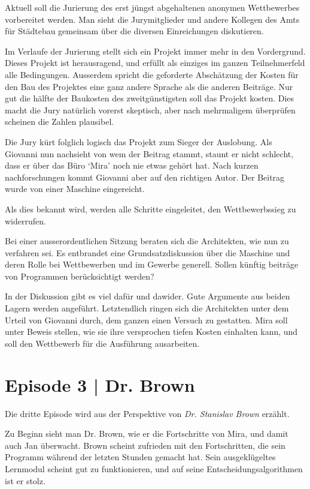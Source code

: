 \documentclass[11pt,a4paper,ngerman]{scrreprt}
\begin{document}
Aktuell soll die Jurierung des erst jüngst abgehaltenen anonymen Wettbewerbes
vorbereitet werden. Man sieht die Jurymitglieder und andere Kollegen des Amts
für Städtebau gemeinsam über die diversen Einreichungen diskutieren.

Im Verlaufe der Jurierung stellt sich ein Projekt immer mehr in den
Vordergrund. Dieses Projekt ist herausragend, und erfüllt als einziges im
ganzen Teilnehmerfeld alle Bedingungen. Ausserdem spricht die geforderte
Abschätzung der Kosten für den Bau des Projektes eine ganz andere Sprache als
die anderen Beiträge. Nur gut die hälfte der Baukosten des zweitgünstigsten
soll das Projekt kosten. Dies macht die Jury natürlich vorerst skeptisch,
aber nach mehrmaligem überprüfen scheinen die Zahlen plausibel.

Die Jury kürt folglich logisch das Projekt zum Sieger der Auslobung. Als
Giovanni nun nachsieht von wem der Beitrag stammt, staunt er nicht schlecht,
dass er über das Büro `Mira' noch nie etwas gehört hat. Nach kurzen
nachforschungen kommt Giovanni aber auf den richtigen Autor. Der Beitrag
wurde von einer Maschine eingereicht.

Als dies bekannt wird, werden alle Schritte eingeleitet, den Wettbewerbssieg
zu widerrufen.

Bei einer ausserordentlichen Sitzung beraten sich die Architekten, wie nun zu
verfahren sei. Es entbrandet eine Grundsatzdiskussion über die Maschine und
deren Rolle bei Wettbewerben und im Gewerbe generell. Sollen künftig beiträge
von Programmen berücksichtigt werden?

In der Diskussion gibt es viel dafür und dawider. Gute Argumente aus beiden
Lagern werden angeführt. Letztendlich ringen sich die Architekten unter dem
Urteil von Giovanni durch, dem ganzen einen Versuch zu gestatten. Mira soll
unter Beweis stellen, wie sie ihre versprochen tiefen Kosten einhalten kann,
und soll den Wettbewerb für die Ausführung ausarbeiten.

\section*{Episode 3 | Dr. Brown}

Die dritte Episode wird aus der Perspektive von \emph{Dr. Stanislav Brown}
erzählt.

Zu Beginn sieht man Dr. Brown, wie er die Fortschritte von Mira, und damit
auch Jan überwacht. Brown scheint zufrieden mit den Fortschritten, die sein
Programm während der letzten Stunden gemacht hat. Sein ausgeklügeltes
Lernmodul scheint gut zu funktionieren, und auf seine
Entscheidungsalgorithmen ist er stolz.
\end{document}
